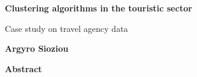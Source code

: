 \begin{center}
    \Large
    \textbf{Clustering algorithms in the touristic sector}
    
    \vspace{0.4cm}
    \large
    Case study on travel agency data
    
    \vspace{0.4cm}
    \textbf{Argyro Sioziou}
    
    \vspace{0.9cm}
    \textbf{Abstract}
\end{center}
